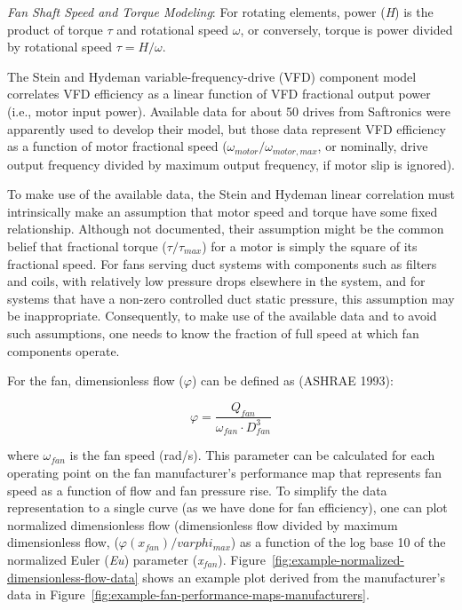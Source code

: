 \emph{Fan Shaft Speed and Torque Modeling}: For rotating elements, power (\emph{H}) is the product of torque \(\tau\) and rotational speed \(\omega\), or conversely, torque is power divided by rotational speed \(\tau = H / \omega\).

The Stein and Hydeman variable-frequency-drive (VFD) component model correlates VFD efficiency as a linear function of VFD fractional output power (i.e., motor input power). Available data for about 50 drives from Saftronics were apparently used to develop their model, but those data represent VFD efficiency as a function of motor fractional speed (\(\omega_{motor} / \omega_{motor,max}\), or nominally, drive output frequency divided by maximum output frequency, if motor slip is ignored).

To make use of the available data, the Stein and Hydeman linear correlation must intrinsically make an assumption that motor speed and torque have some fixed relationship. Although not documented, their assumption might be the common belief that fractional torque (\(\tau / \tau_{max}\)) for a motor is simply the square of its fractional speed. For fans serving duct systems with components such as filters and coils, with relatively low pressure drops elsewhere in the system, and for systems that have a non-zero controlled duct static pressure, this assumption may be inappropriate. Consequently, to make use of the available data and to avoid such assumptions, one needs to know the fraction of full speed at which fan components operate.

For the fan, dimensionless flow (\(\varphi\)) can be defined as (ASHRAE 1993):

\begin{equation}
\varphi = \frac{{{Q_{fan}}}}{{{\omega_{fan}} \cdot D_{fan}^3}} 
\end{equation}

where \(\omega_{fan}\) is the fan speed (rad/s). This parameter can be calculated for each operating point on the fan manufacturer's performance map that represents fan speed as a function of flow and fan pressure rise. To simplify the data representation to a single curve (as we have done for fan efficiency), one can plot normalized dimensionless flow (dimensionless flow divided by maximum dimensionless flow, (\(\varphi({x_{fan}}) / varphi_{max}\)) as a function of the log base 10 of the normalized Euler (\emph{Eu}) parameter (\emph{x\(_{fan}\)}). Figure~\ref{fig:example-normalized-dimensionless-flow-data} shows an example plot derived from the manufacturer's data in Figure~\ref{fig:example-fan-performance-maps-manufacturers}.

